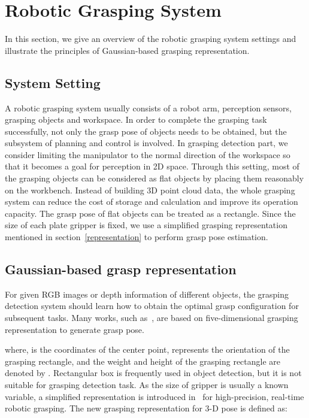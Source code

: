 \documentclass[journal]{IEEEtran}
\begin{document}
\section{Robotic Grasping System}
\label{sec-system}
In this section, we give an overview of the robotic grasping system settings and illustrate the principles of Gaussian-based grasping representation.

\subsection{System Setting}
\label{section_2.4}
A robotic grasping system usually consists of a robot arm, perception sensors, grasping objects and workspace. In order to complete the grasping task successfully, not only the grasp pose of objects needs to be obtained, but the subsystem of planning and control is involved. In grasping detection part, we consider limiting the manipulator to the normal direction of the workspace so that it becomes a goal for perception in 2D space. Through this setting, most of the grasping objects can be considered as flat objects by placing them reasonably on the workbench. Instead of building 3D point cloud data, the whole grasping system can reduce the cost of storage and calculation and improve its operation capacity. The grasp pose of flat objects can be treated as a rectangle. Since the size of each plate gripper is fixed, we use a simplified grasping representation mentioned in section~\ref{representation} to perform grasp pose estimation. 



\subsection{Gaussian-based grasp representation}
\label{representation_gaussian}
For given RGB images or depth information of different objects, the grasping detection system should learn how to obtain the optimal grasp configuration for subsequent tasks. Many works, such as~\cite{guo,chu,zhou}, are based on five-dimensional grasping representation to generate grasp pose.



where,  is the coordinates of the center point,  represents the orientation of the grasping rectangle, and the weight and height of the grasping rectangle are denoted by . Rectangular box is frequently used in object detection, but it is not suitable for grasping detection task. As the size of gripper is usually a known variable, a simplified representation is introduced in~\cite{ggcnn} for high-precision, real-time robotic grasping. The new grasping representation for 3-D pose is defined as:
\end{document}
